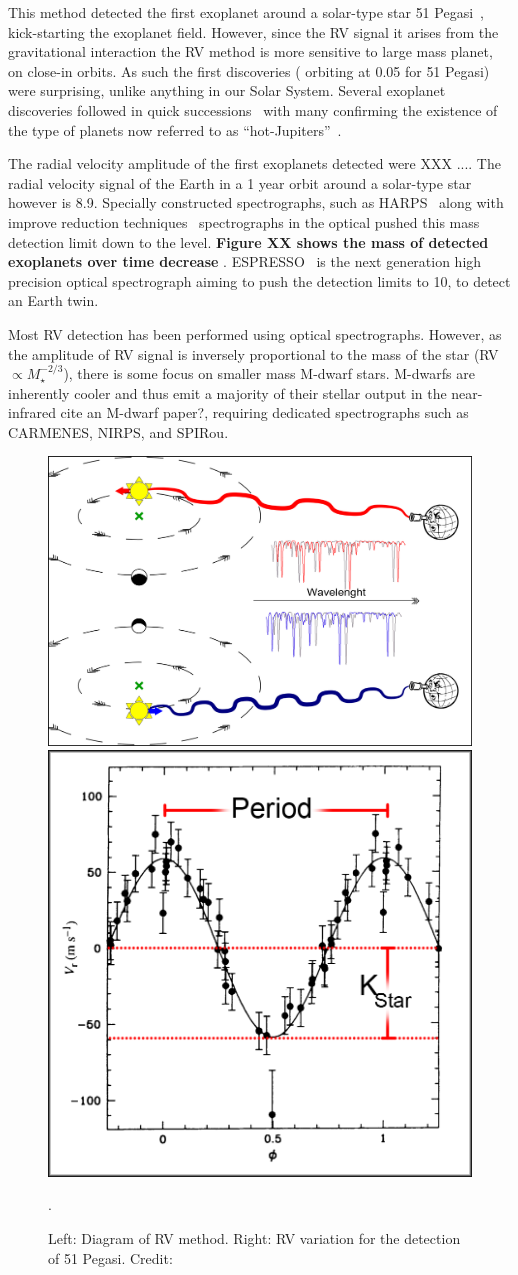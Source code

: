 This method detected the first exoplanet around a solar-type star {51 Pegasi}~\citep{mayor_jupitermass_1995}, kick-starting the exoplanet field.
However, since the RV signal it arises from the gravitational interaction the RV method is more sensitive to large mass planet, on close-in orbits.
As such the first discoveries (\Mjup{} orbiting at 0.05\AU{} for {51 Pegasi}) were surprising, unlike anything in our Solar System.
Several exoplanet discoveries followed in quick successions~\citep[e.g.][]{butler_planet_1996, marcy_planetary_1996} with many confirming the existence of the type of planets now referred to as ``hot-Jupiters''~\citep{butler_three_1997, charbonneau_detection_2000}.

The radial velocity amplitude of the first exoplanets detected were XXX \kmps....
The radial velocity signal of the Earth in a 1 year orbit around a solar-type star however is 8.9\cmps{}\citep{figueira_radial_2010}.
Specially constructed spectrographs, such as HARPS~\citep{mayor_setting_2003)} along with improve reduction techniques~\citet{lovis_new_2007} spectrographs in the optical pushed this mass detection limit down to the \mps{} level.\textbf{ Figure XX shows the mass of detected exoplanets over time decrease} .
ESPRESSO~\citep{pepe_espresso_2014, megevand_espresso_2014} is the next generation high precision optical spectrograph aiming to push the detection limits to 10\cmps, to detect an Earth twin.

Most RV detection has been performed using optical spectrographs. However, as the amplitude of RV signal is inversely proportional to the mass of the star (RV $\propto M_{\star}^{-2/3}$), there is some focus on smaller mass M-dwarf stars. M-dwarfs are inherently cooler and thus emit a majority of their stellar output in the near-infrared {cite an M-dwarf paper?}, requiring dedicated \nir spectrographs such as {CARMENES}, {NIRPS}, and {SPIRou}.

\begin{figure}
    \centering
        \includegraphics[width=0.45\linewidth]{./figures/introduction/RV_Diagram}
    \includegraphics[width=0.3\linewidth]{./figures/introduction/PhaseFolded_51Pegb_Mayor_et_al_1995}
    \caption{Left: Diagram of {RV} method. Right: {RV} variation for the detection of {51 Pegasi}. Credit:~\citet{mayor_jupitermass_1995}}.
    \label{fig:rvdiagram-mayor}
\end{figure}


